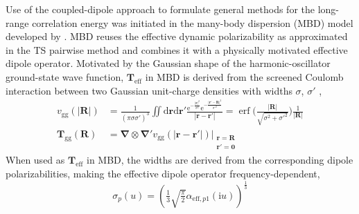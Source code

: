 Use of the coupled-dipole approach to formulate general methods for the long-range correlation energy was initiated in the many-body dispersion (MBD) model developed by \citet{TkatchenkoPRL12}.
MBD reuses the effective dynamic polarizability as approximated in the TS pairwise method and combines it with a physically motivated effective dipole operator.
Motivated by the Gaussian shape of the harmonic-oscillator ground-state wave function, $\mathbf T_\text{eff}$ in MBD is derived from the screened Coulomb interaction between two Gaussian unit-charge densities with widths $\sigma$, $\sigma'$ \citep{MayerPRB07},
\begin{align}
  v_\text{gg}(|\mathbf R|)&=\frac1{(\pi\sigma\sigma')^3}\iint\mathrm d\mathbf r\mathrm d\mathbf r'\frac{\mathrm e^{-\frac{|\mathbf r|^2}{\sigma^2}}\mathrm e^{-\frac{|\mathbf r'-\mathbf R|^2}{\sigma'^2}}}{|\mathbf r-\mathbf r'|}=\operatorname{erf}\Bigg(\frac{\lvert\mathbf R\rvert}{\sqrt{\sigma^2+\sigma'^2}}\Bigg)\frac1{\lvert\mathbf R\rvert}  \\
  \mathbf T_\text{gg}(\mathbf R)&=\boldsymbol\nabla\otimes\boldsymbol\nabla'v_\text{gg}(|\mathbf r-\mathbf r'|)\Big|_{\substack{\mathbf r=\mathbf R\\\mathbf r'=\mathbf 0}}
  \label{eq:mayer}
\end{align}
When used as $\mathbf T_\text{eff}$ in MBD, the widths are derived from the corresponding dipole polarizabilities, making the effective dipole operator frequency-dependent,
\begin{equation}
  \sigma_p(u)=\left(\tfrac13\sqrt{\tfrac\pi2}\alpha_{\text{eff},p1}(\mathrm iu)\right)^\frac13
\end{equation}

